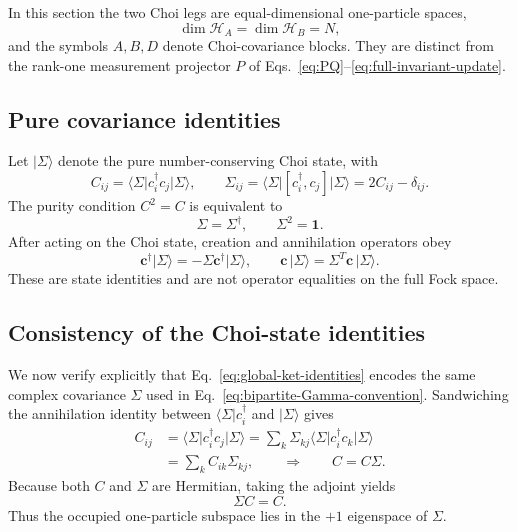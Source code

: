 \documentclass[aps,prb,onecolumn,nofootinbib,superscriptaddress]{revtex4-2}
\newcommand{\I}{\mathbf{1}}
\newcommand{\ket}[1]{\lvert #1\rangle}
\newcommand{\bra}[1]{\langle #1\rvert}
\newcommand{\cH}{\mathcal{H}}
\theoremstyle{plain}
\theoremstyle{definition}
\begin{document}
In this section the two Choi legs are equal-dimensional one-particle spaces,
\begin{equation}
  \dim\cH_A=\dim\cH_B=N,
  \label{eq:equal-choi-leg-dimensions}
\end{equation}
and the symbols \(A,B,D\) denote Choi-covariance blocks.  They are distinct
from the rank-one measurement projector \(P\) of
Eqs.~\eqref{eq:PQ}--\eqref{eq:full-invariant-update}.

\subsection{Pure covariance identities}

Let \(\ket{\Sigma}\) denote the pure number-conserving Choi state, with
\begin{equation}
  C_{ij}=\bra{\Sigma}c_i^\dagger c_j\ket{\Sigma},
  \qquad
  \Sigma_{ij}=\bra{\Sigma}[c_i^\dagger,c_j]\ket{\Sigma}
  =2C_{ij}-\delta_{ij}.
  \label{eq:bipartite-Gamma-convention}
\end{equation}
The purity condition \(C^2=C\) is equivalent to
\begin{equation}
  \Sigma=\Sigma^\dagger,
  \qquad
  \Sigma^2=\I.
  \label{eq:bipartite-purity}
\end{equation}
After acting on the Choi state, creation and annihilation operators obey
\begin{equation}
  \bm c^\dagger\ket{\Sigma}
  =
  -\Sigma\bm c^\dagger\ket{\Sigma},
  \qquad
  \bm c\,\ket{\Sigma}
  =
  \Sigma^T\bm c\,\ket{\Sigma}.
  \label{eq:global-ket-identities}
\end{equation}
These are state identities and are not operator equalities on the full Fock
space.

\subsection{Consistency of the Choi-state identities}

We now verify explicitly that Eq.~\eqref{eq:global-ket-identities} encodes
the same complex covariance \(\Sigma\) used in
Eq.~\eqref{eq:bipartite-Gamma-convention}.  Sandwiching the annihilation
identity between \(\bra{\Sigma}c_i^\dagger\) and \(\ket{\Sigma}\) gives
\begin{align}
  C_{ij}
  &=
  \bra{\Sigma}c_i^\dagger c_j\ket{\Sigma}
  =
  \sum_k \Sigma_{kj}
  \bra{\Sigma}c_i^\dagger c_k\ket{\Sigma}
  \nonumber\\
  &=
  \sum_k C_{ik}\Sigma_{kj},
  \qquad\Longrightarrow\qquad
  C=C\Sigma .
  \label{eq:annihilation-identity-recovers-occupied-sector}
\end{align}
Because both \(C\) and \(\Sigma\) are Hermitian, taking the adjoint yields
\begin{equation}
  \Sigma C=C.
  \label{eq:occupied-plus-sector}
\end{equation}
Thus the occupied one-particle subspace lies in the \(+1\) eigenspace of
\(\Sigma\).
\end{document}
